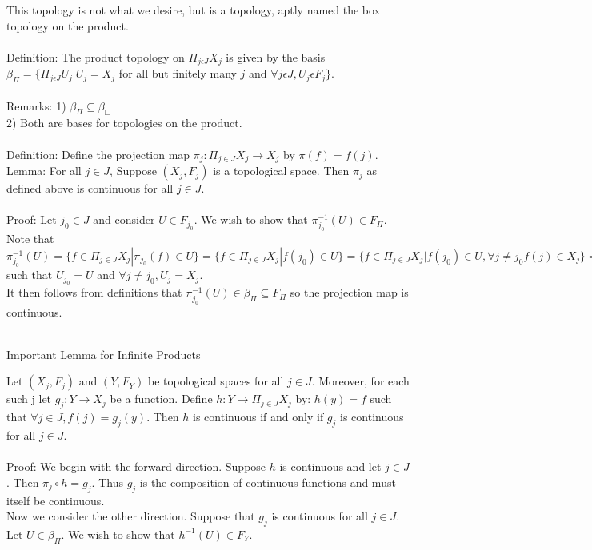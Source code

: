\documentclass{article}
\begin{document}
This topology is not what we desire, but is a topology, aptly named the box topology on the product.
\\
\\
Definition: The product topology on $\Pi_{j \epsilon J}X_j$ is given by the basis $\beta_{\Pi} = \{\Pi_{j \epsilon J}U_j|U_j = X_j$ for all but finitely many $j$ and $\forall j \epsilon J, U_j \epsilon F_j \}$.
\\
\\
Remarks: 1) $\beta_{\Pi} \subseteq \beta_{\Box}$ \\
2) Both are bases for topologies on the product.
\\
\\
Definition: Define the projection map $\pi_j : \Pi_{j \in J}X_j \rightarrow X_j$ by $\pi(f) = f(j)$.
\\
Lemma: For all $j \in J$, Suppose $(X_j, F_j)$ is a topological space.  Then $\pi_j$ as defined above is continuous for all $j \in J$.
\\
\\
Proof: Let $j_{0} \in J$ and consider $U \in F_{j_{0}}$. We wish to show that $\pi_{j_{0}}^{-1}(U) \in  F_{\Pi}$.  Note that $\pi_{j_{0}}^{-1}(U) = \{f \in \Pi_{j \in J}X_j | \pi_{j_{0}}(f) \in U\} = \{f \in \Pi_{j \in J}X_j | f(j_{0}) \in U\} = \{f \in \Pi_{j \in J}X_j | f(j_{0}) \in U, \forall j \neq j_{0} f(j) \in X_{j}\}= \Pi_{j \in J} U_j$ such that $U_{j_{0}} = U$ and $\forall j \neq j_{0}, U_j = X_j$.\\
It then follows from definitions that $\pi_{j_{0}}^{-1}(U) \in \beta_{\Pi} \subseteq F_{\Pi}$ so the projection map is continuous.\\
\\
\begin{center}
Important Lemma for Infinite Products
\end{center}
Let $(X_j,F_j)$ and $(Y,F_Y)$ be topological spaces for all $j \in J$.  Moreover, for each such j let $g_j : Y \rightarrow X_j$ be a function.  Define $h: Y \rightarrow \Pi_{j \in J}X_j$ by: $h(y) = f$ such that $\forall j \in J, f(j) = g_{j}(y)$.  Then $h$ is continuous if and only if $g_j$ is continuous for all $j \in J$.\\
\\
Proof: We begin with the forward direction. Suppose $h$ is continuous and let $j \in J$.  Then $\pi_j \circ h = g_j$.  Thus $g_j$ is the composition of continuous functions and must itself be continuous.\\
Now we consider the other direction.  Suppose that $g_j$ is continuous for all $j \in J$.  Let $U \in \beta_{\Pi}.$  We wish to show that $h^{-1}(U) \in F_{Y}$.\\
\end{document}
